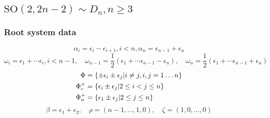 
\subsection[SO(2,2n-2)]{$\mathrm{SO}(2,2n-2) \sim D_n, n\geq 3$}\label{sec:conf_even}

\subsubsection{Root system data}

\[\alpha_i = \epsilon_i - \epsilon_{i+1}, i<n, \alpha_n = \epsilon_{n-1} + \epsilon_n\]
\[\omega_i = \epsilon_1+\cdots \epsilon_i, i < n-1, \quad \omega_{n-1} = \frac{1}{2}(\epsilon_1 + \cdots \epsilon_{n-1}-\epsilon_n), \quad \omega_{n} = \frac{1}{2}(\epsilon_1 + \cdots \epsilon_{n-1}+\epsilon_n)\]
\begin{align*}
 \Phi &= \{ \pm \epsilon_i \pm \epsilon_j | i\neq j, i,j = 1\ldots n \} \\
 \Phi_c^+ &= \{ \epsilon_i\pm \epsilon_j | 2\leq i < j \leq  n\}\\
 \Phi_n^+ &= \{ \epsilon_1 \pm \epsilon_j | 2 \leq  j \leq n \}
 \end{align*}
\[\beta = \epsilon_1+\epsilon_2,\quad \rho = (n-1,\ldots ,1,0),\quad \zeta = (1,0,\ldots,0)\]

